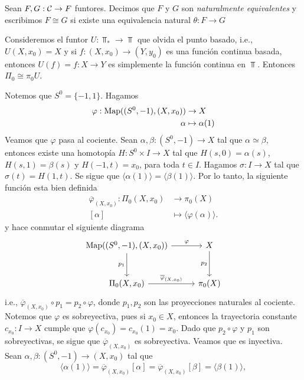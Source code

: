 \begin{definicion}
    Sean $F,G:\mathcal{C}\to F$ funtores. Decimos que $F$ y $G$ son \textit{naturalmente equivalentes} y escribimos $F\cong G$ si existe una equivalencia natural $\theta:F\to G$
\end{definicion}
\begin{ejemplo}
    Consideremos el funtor $U:\Top_*\to\Top$ que olvida el punto basado, i.e., $U(X,x_0)=X$ y si $f:(X,x_0)\to (Y,y_0)$ es una función continua basada, entonces $U(f)=f:X\to Y$ es simplemente la función continua en $\Top$. Entonces $\Pi_0\cong \pi_0 U$. 

    Notemos que $S^{0}=\{-1,1\}$. Hagamos 
    \begin{align*}
        \varphi:\mathrm{Map}((S^0,-1),(X,x_0))&\to X\\
        \alpha & \mapsto \alpha(1)
    \end{align*}
    Veamos que $\varphi$ pasa al cociente. Sean $\alpha,\beta:(S^0,-1)\to X$ tal que $\alpha\simeq \beta,$ entonces existe una homotopía $H:S^0\times I\to X$ tal que $H(s,0)=\alpha(s)$, $H(s,1)=\beta(s)$ y $H(-1,t)=x_0$, para toda $t\in I$. Hagamos $\sigma:I\to X$ tal que $\sigma(t)=H(1,t)$. Se sigue que $\langle \alpha(1)\rangle=\langle \beta(1)\rangle$. Por lo tanto, la siguiente función esta bien definida 
    \begin{align*}
        \overline{\varphi}_{(X,x_0)}:\Pi_0(X,x_0)&\to\pi_0(X)\\
        [\alpha]&\mapsto \langle \varphi(\alpha)\rangle.
    \end{align*}
    y hace conmutar el siguiente diagrama
    \[
    \begin{tikzcd}[column sep=1cm, row sep=1cm] 
        \map((S^0,-1),(X,x_0))\arrow[r,"\varphi"] \arrow[d,"p_1"'] & X
        \arrow[d,"p_2"']\\
        \Pi_0(X,x_0)\arrow[r,"\overline{\varphi}_{(X,x_0)}"] & \pi_0(X)
\end{tikzcd}
    \]
    i.e., $\overline{\varphi}_{(X,x_0)}\circ p_1=p_2\circ\varphi$, donde $p_1,p_2$ son las proyecciones naturales al cociente. Notemos que $\varphi$ es sobreyectiva, pues si $x_0\in X$, entonces la trayectoria constante $c_{x_0}:I\to X$ cumple que $\varphi(c_{x_0})=c_{x_0}(1)=x_0$. Dado que $p_2\circ\varphi$ y $p_1$ son sobreyectivas, se sigue que $\overline{\varphi}_{(X,x_0)}$ es sobreyectiva. Veamos que es inyectiva. Sean $\alpha,\beta:(S^0,-1)\to (X,x_0)$ tal que 
    $$\langle\alpha(1)\rangle=\overline{\varphi}_{(X,x_0)}[\alpha]= \overline{\varphi}_{(X,x_0)}[\beta]=\langle\beta(1)\rangle,$$

\end{ejemplo}
